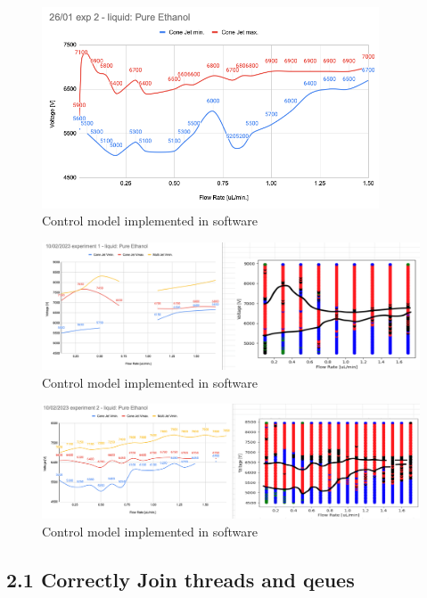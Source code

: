     \begin{figure}[H]
        \center
        \includegraphics[width=10cm]{images/image_folder_report_4/manualMap3.png}
        \caption{Control model implemented in software}
    \end{figure}

    \begin{figure}[H]
        \center
        \includegraphics[width=15cm]{images/image_folder_report_4/mapXman-1.png}
        \caption{Control model implemented in software}
    \end{figure}

    \begin{figure}[H]
        \center
        \includegraphics[width=15cm]{images/image_folder_report_4/mapXman-2.png}
        \caption{Control model implemented in software}
    \end{figure}



\subsection*{2.1 Correctly Join threads and qeues}
